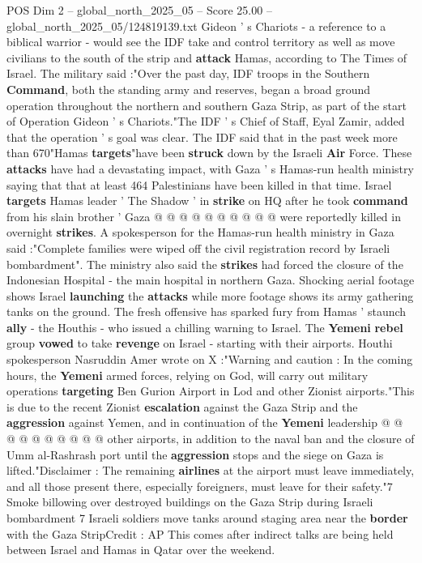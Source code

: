 \begin{textsample}{POS Dim 2 – global\_north\_2025\_05 – Score 25.00 – global\_north\_2025\_05/124819139.txt}  \label{ex:f2_pos_401}
Gideon ' s Chariots - a reference to a biblical warrior - would see the IDF take and control territory as well as move civilians to the south of the strip and \textbf{attack} Hamas, according to The Times of Israel.
The military said :"Over the past day, IDF troops in the Southern \textbf{Command}, both the standing army and reserves, began a broad ground operation throughout the northern and southern Gaza Strip, as part of the start of Operation Gideon ' s Chariots."The IDF ' s Chief of Staff, Eyal Zamir, added that the operation ' s goal was clear.
The IDF said that in the past week more than 670"Hamas \textbf{targets}"have been \textbf{struck} down by the Israeli \textbf{Air} Force.
These \textbf{attacks} have had a devastating impact, with Gaza ' s Hamas-run health ministry saying that that at least 464 Palestinians have been killed in that time.
Israel \textbf{targets} Hamas leader ' The Shadow ' in \textbf{strike} on HQ after he took \textbf{command} from his slain brother ' Gaza @ @ @ @ @ @ @ @ @ @ were reportedly killed in overnight \textbf{strikes}.
A spokesperson for the Hamas-run health ministry in Gaza said :"Complete families were wiped off the civil registration record by Israeli bombardment".
The ministry also said the \textbf{strikes} had forced the closure of the Indonesian Hospital - the main hospital in northern Gaza.
Shocking aerial footage shows Israel \textbf{launching} the \textbf{attacks} while more footage shows its army gathering tanks on the ground.
The fresh offensive has sparked fury from Hamas ' staunch \textbf{ally} - the Houthis - who issued a chilling warning to Israel.
The \textbf{Yemeni} \textbf{rebel} group \textbf{vowed} to take \textbf{revenge} on Israel - starting with their airports.
Houthi spokesperson Nasruddin Amer wrote on X :"Warning and caution : In the coming hours, the \textbf{Yemeni} armed forces, relying on God, will carry out military operations \textbf{targeting} Ben Gurion Airport in Lod and other Zionist airports."This is due to the recent Zionist \textbf{escalation} against the Gaza Strip and the \textbf{aggression} against Yemen, and in continuation of the \textbf{Yemeni} leadership @ @ @ @ @ @ @ @ @ @ other airports, in addition to the naval ban and the closure of Umm al-Rashrash port until the \textbf{aggression} stops and the siege on Gaza is lifted."Disclaimer : The remaining \textbf{airlines} at the airport must leave immediately, and all those present there, especially foreigners, must leave for their safety."7 Smoke billowing over destroyed buildings on the Gaza Strip during Israeli bombardment 7 Israeli soldiers move tanks around staging area near the \textbf{border} with the Gaza StripCredit : AP This comes after indirect talks are being held between Israel and Hamas in Qatar over the weekend.

\end{textsample}
